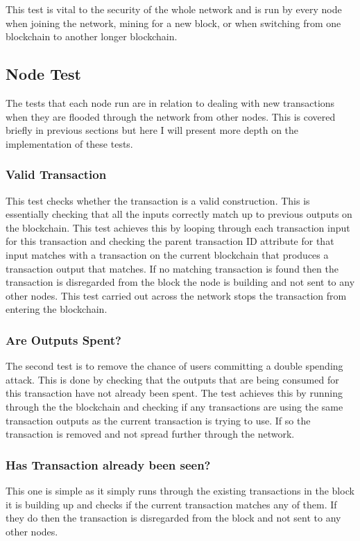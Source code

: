 \documentclass{l4proj}
\begin{document}
This test is vital to the security of the whole network and is run by every node when joining the network,
mining for a new block, or when switching from one blockchain to another longer blockchain.

\subsection{Node Test}
The tests that each node run are in relation to dealing with new transactions when they are flooded through
the network from other nodes. This is covered briefly in previous sections but here I will present more depth
on the implementation of these tests.

\subsubsection{Valid Transaction}
This test checks whether the transaction is a valid construction. This is essentially checking that all the inputs
correctly match up to previous outputs on the blockchain. This test achieves this by looping through each transaction
input for this transaction and checking the parent transaction ID attribute for that input matches with a transaction
on the current blockchain that produces a transaction output that matches. If no matching transaction is found
then the transaction is disregarded from the block the node is building and not sent to any other nodes. This test
carried out across the network stops the transaction from entering the blockchain.

\subsubsection{Are Outputs Spent?}
The second test is to remove the chance of users committing a double spending attack. This is done by checking
that the outputs that are being consumed for this transaction have not already been spent. The test achieves this
by running through the the blockchain and checking if any transactions are using the same transaction outputs 
as the current transaction is trying to use. If so the transaction is removed and not spread further through
the network.

\subsubsection{Has Transaction already been seen?}
This one is simple as it simply runs through the existing transactions in the block it is building up and
checks if the current transaction matches any of them. If they do then the transaction is disregarded from the
block and not sent to any other nodes.
\end{document}
